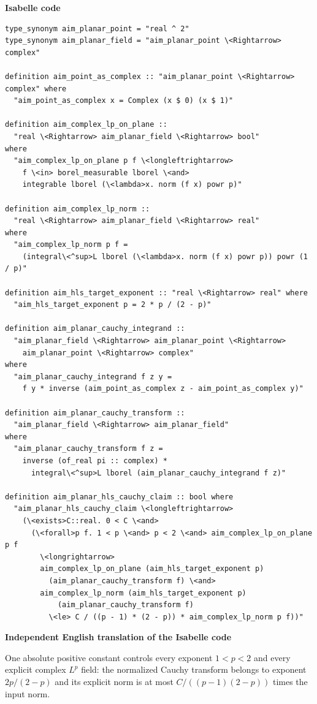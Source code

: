 \documentclass[10pt,oneside]{article}
\newcommand{\reviewlabel}[1]{\par\smallskip\noindent\textsf{\bfseries #1}\par\smallskip}
\begin{document}
\reviewlabel{Isabelle code}
\begin{lstlisting}
type_synonym aim_planar_point = "real ^ 2"
type_synonym aim_planar_field = "aim_planar_point \<Rightarrow> complex"

definition aim_point_as_complex :: "aim_planar_point \<Rightarrow> complex" where
  "aim_point_as_complex x = Complex (x $ 0) (x $ 1)"

definition aim_complex_lp_on_plane ::
  "real \<Rightarrow> aim_planar_field \<Rightarrow> bool"
where
  "aim_complex_lp_on_plane p f \<longleftrightarrow>
    f \<in> borel_measurable lborel \<and>
    integrable lborel (\<lambda>x. norm (f x) powr p)"

definition aim_complex_lp_norm ::
  "real \<Rightarrow> aim_planar_field \<Rightarrow> real"
where
  "aim_complex_lp_norm p f =
    (integral\<^sup>L lborel (\<lambda>x. norm (f x) powr p)) powr (1 / p)"

definition aim_hls_target_exponent :: "real \<Rightarrow> real" where
  "aim_hls_target_exponent p = 2 * p / (2 - p)"

definition aim_planar_cauchy_integrand ::
  "aim_planar_field \<Rightarrow> aim_planar_point \<Rightarrow>
    aim_planar_point \<Rightarrow> complex"
where
  "aim_planar_cauchy_integrand f z y =
    f y * inverse (aim_point_as_complex z - aim_point_as_complex y)"

definition aim_planar_cauchy_transform ::
  "aim_planar_field \<Rightarrow> aim_planar_field"
where
  "aim_planar_cauchy_transform f z =
    inverse (of_real pi :: complex) *
      integral\<^sup>L lborel (aim_planar_cauchy_integrand f z)"

definition aim_planar_hls_cauchy_claim :: bool where
  "aim_planar_hls_cauchy_claim \<longleftrightarrow>
    (\<exists>C::real. 0 < C \<and>
      (\<forall>p f. 1 < p \<and> p < 2 \<and> aim_complex_lp_on_plane p f
        \<longrightarrow>
        aim_complex_lp_on_plane (aim_hls_target_exponent p)
          (aim_planar_cauchy_transform f) \<and>
        aim_complex_lp_norm (aim_hls_target_exponent p)
            (aim_planar_cauchy_transform f)
          \<le> C / ((p - 1) * (2 - p)) * aim_complex_lp_norm p f))"
\end{lstlisting}

\reviewlabel{Independent English translation of the Isabelle code}
One absolute positive constant controls every exponent $1<p<2$ and every explicit complex $L^p$ field: the normalized Cauchy transform belongs to exponent $2p/(2-p)$ and its explicit norm is at most $C/((p-1)(2-p))$ times the input norm.
\end{document}
